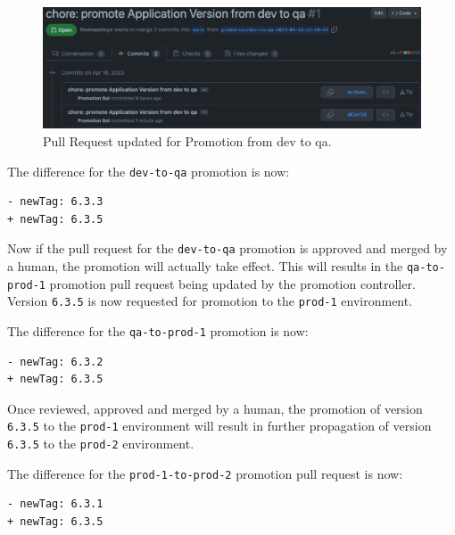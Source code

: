 \begin{figure}[h]
	\centering
	\includegraphics[width=1.00\linewidth]{assets/prom-pr-dev-to-qa-round2.png}
	\caption{Pull Request updated for Promotion from dev to qa.
	}
	\label{fig:prom-pr-dev-to-qa-round2}	
\end{figure}

The difference for the \lstinline|dev-to-qa| promotion is now:

\begin{lstlisting}
- newTag: 6.3.3
+ newTag: 6.3.5
\end{lstlisting}


Now if the pull request for the \lstinline|dev-to-qa| promotion
is approved and merged by a human,
the promotion will actually take effect.
This will results in the \lstinline|qa-to-prod-1| promotion pull request being updated
by the promotion controller.
Version \lstinline|6.3.5| is now requested for promotion to the
\lstinline|prod-1| environment.

The difference for the \lstinline|qa-to-prod-1| promotion is now:

\begin{lstlisting}
- newTag: 6.3.2
+ newTag: 6.3.5
\end{lstlisting}

Once reviewed, approved and merged by a human,
the promotion of version \lstinline|6.3.5| to the \lstinline|prod-1| environment
will result in further propagation of version \lstinline|6.3.5|
to the \lstinline|prod-2| environment.

The difference for the \lstinline|prod-1-to-prod-2| promotion pull request is now:

\begin{lstlisting}
- newTag: 6.3.1
+ newTag: 6.3.5
\end{lstlisting}

